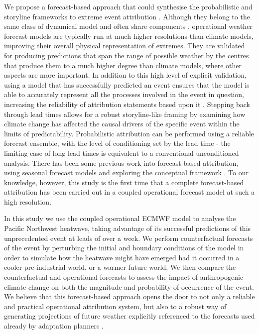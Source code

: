   We propose a forecast-based approach that could synthesise the probabilistic and storyline frameworks to extreme event attribution \cite{leach_forecast-based_2021}. Although they belong to the same class of dynamical model and often share components \cite{roberts_climate_2018}, operational weather forecast models are typically run at much higher resolutions than climate models, improving their overall physical representation of extremes. They are validated for producing predictions that span the range of possible weather by the centres that produce them to a much higher degree than climate models, where other aspects are more important. In addition to this high level of explicit validation, using a model that has successfully predicted an event ensures that the model is able to accurately represent all the processes involved in the event in question, increasing the reliability of attribution statements based upon it \cite{palmer_simple_2018}. Stepping back through lead times allows for a robust storyline-like framing by examining how climate change has affected the causal drivers of the specific event within the limits of predictability. Probabilistic attribution can be performed using a reliable forecast ensemble, with the level of conditioning set by the lead time - the limiting case of long lead times is equivalent to a conventional unconditioned analysis. There has been some previous work into forecast-based attribution, using seasonal forecast models \cite{hope_contributors_2015,hope_what_2016,hope_determining_2019,wang_initialized_2021,hope_subseasonal_2022} and exploring the conceptual framework \cite{pall_diagnosing_2017,wehner_estimating_2019,tradowsky_toward_2022}. To our knowledge, however, this study is the first time that a complete forecast-based attribution has been carried out in a coupled operational forecast model at such a high resolution.

  In this study we use the coupled operational ECMWF model to analyse the Pacific Northwest heatwave, taking advantage of its successful predictions of this unprecedented event at leads of over a week. We perform counterfactual forecasts of the event by perturbing the initial and boundary conditions of the model in order to simulate how the heatwave might have emerged had it occurred in a cooler pre-industrial world, or a warmer future world. We then compare the counterfactual and operational forecasts to assess the impact of anthropogenic climate change on both the magnitude and probability-of-occurrence of the event. We believe that this forecast-based approach opens the door to not only a reliable and practical operational attribution system, but also to a robust way of generating projections of future weather explicitly referenced to the forecasts used already by adaptation planners \cite{hazeleger_tales_2015}.

